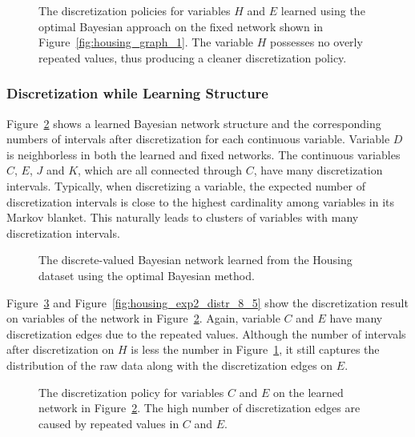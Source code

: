 \begin{figure}[ht]
  \centering
  
  \caption{
    The discretization policies for variables $H$ and $E$ learned using the optimal Bayesian approach on the fixed network shown in Figure~\ref{fig:housing_graph_1}.
    The variable $H$ possesses no overly repeated values, thus producing a cleaner discretization policy.
  }
  \label{fig:housing_exp1_distr_8_5}
\end{figure}

\subsubsection{Discretization while Learning Structure}
\label{subsubsec:housing_exp2}

Figure~\ref{fig:housing_graph_2} shows a learned Bayesian network structure and the corresponding numbers of intervals after discretization for each continuous variable.
Variable $D$ is neighborless in both the learned and fixed networks.
The continuous variables $C$, $E$, $J$ and $K$, which are all connected through $C$, have many discretization intervals.
Typically, when discretizing a variable, the expected number of discretization intervals is close to the highest cardinality among variables in its Markov blanket.
This naturally leads to clusters of variables with many discretization intervals.

\begin{figure}[ht]
  \centering
  \scalebox{0.8}{}
  \caption{
    The discrete-valued Bayesian network learned from the Housing dataset using the optimal Bayesian method.
  }
  \label{fig:housing_graph_2}
\end{figure}

Figure~\ref{fig:housing_exp2_distr_3_5} and Figure~\ref{fig:housing_exp2_distr_8_5} show the discretization result on variables of the network in Figure~\ref{fig:housing_graph_2}.
Again, variable $C$ and $E$ have many discretization edges due to the repeated values.
Although the number of intervals after discretization on $H$ is less the number in Figure~\ref{fig:housing_exp1_distr_8_5}, it still captures the distribution of the raw data along with the discretization edges on $E$.

\begin{figure}[ht]
  \centering
  
  \caption{
    The discretization policy for variables $C$ and $E$ on the learned network in Figure~\ref{fig:housing_graph_2}.
    The high number of discretization edges are caused by repeated values in $C$ and $E$.
  }
  \label{fig:housing_exp2_distr_3_5}
\end{figure}

